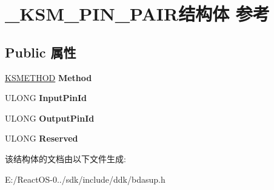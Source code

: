 \hypertarget{struct___k_s_m___p_i_n___p_a_i_r}{}\section{\+\_\+\+K\+S\+M\+\_\+\+P\+I\+N\+\_\+\+P\+A\+I\+R结构体 参考}
\label{struct___k_s_m___p_i_n___p_a_i_r}
\subsection*{Public 属性}
\begin{DoxyCompactItemize}
\item 
\mbox{\label{struct___k_s_m___p_i_n___p_a_i_r_a031bb8d0197121c0f1cbb5c8a3d777c6}} 
\hyperlink{struct_k_s_i_d_e_n_t_i_f_i_e_r}{K\+S\+M\+E\+T\+H\+OD} {\bfseries Method}
\item 
\mbox{\label{struct___k_s_m___p_i_n___p_a_i_r_a0208483b421fad6198f6b7eeaa7a631f}} 
U\+L\+O\+NG {\bfseries Input\+Pin\+Id}
\item 
\mbox{\label{struct___k_s_m___p_i_n___p_a_i_r_a91db5f27948cd37ceee372778743faa0}} 
U\+L\+O\+NG {\bfseries Output\+Pin\+Id}
\item 
\mbox{\label{struct___k_s_m___p_i_n___p_a_i_r_ace05dd14a3e643842198a4d894177b90}} 
U\+L\+O\+NG {\bfseries Reserved}
\end{DoxyCompactItemize}


该结构体的文档由以下文件生成\+:\begin{DoxyCompactItemize}
\item 
E\+:/\+React\+O\+S-\/0../sdk/include/ddk/bdasup.\+h\end{DoxyCompactItemize}

